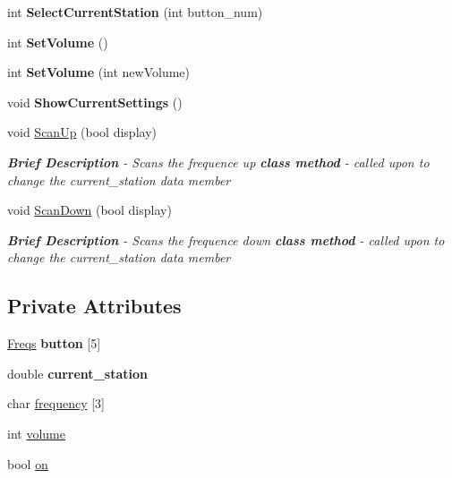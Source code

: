 \begin{DoxyCompactItemize}
\item 
\hypertarget{class_amfm_radio_ad6aaa684e7dd3fe5d29b626f8f40718d}{int {\bfseries Select\-Current\-Station} (int button\-\_\-num)}\label{class_amfm_radio_ad6aaa684e7dd3fe5d29b626f8f40718d}

\item 
\hypertarget{class_amfm_radio_af1b3db50addf8a0ab32eae9f2e2c321b}{int {\bfseries Set\-Volume} ()}\label{class_amfm_radio_af1b3db50addf8a0ab32eae9f2e2c321b}

\item 
\hypertarget{class_amfm_radio_a173aed5a3f29e59b47d113a444207a75}{int {\bfseries Set\-Volume} (int new\-Volume)}\label{class_amfm_radio_a173aed5a3f29e59b47d113a444207a75}

\item 
\hypertarget{class_amfm_radio_a2ecffea4f575d265b849f283110d46fe}{void {\bfseries Show\-Current\-Settings} ()}\label{class_amfm_radio_a2ecffea4f575d265b849f283110d46fe}

\item 
void \hyperlink{class_amfm_radio_a520620b35bb69e35efbccc52a159afbb}{Scan\-Up} (bool display)
\begin{DoxyCompactList}\small\item\em {\bfseries Brief Description} -\/ Scans the frequence up {\bfseries {\itshape class method}} -\/ called upon to change the current\-\_\-station data member \end{DoxyCompactList}\item 
void \hyperlink{class_amfm_radio_a70034b73f832e7f3b73d9cdca0691401}{Scan\-Down} (bool display)
\begin{DoxyCompactList}\small\item\em {\bfseries Brief Description} -\/ Scans the frequence down {\bfseries {\itshape class method}} -\/ called upon to change the current\-\_\-station data member \end{DoxyCompactList}\end{DoxyCompactItemize}
\subsection*{Private Attributes}
\begin{DoxyCompactItemize}
\item 
\hypertarget{class_amfm_radio_a1d41c6597c8f8f57429cb973ddcac5cb}{\hyperlink{struct_freqs}{Freqs} {\bfseries button} \mbox{[}5\mbox{]}}\label{class_amfm_radio_a1d41c6597c8f8f57429cb973ddcac5cb}

\item 
\hypertarget{class_amfm_radio_abf7dcece93ab1ddd45be0b1da20511b4}{double {\bfseries current\-\_\-station}}\label{class_amfm_radio_abf7dcece93ab1ddd45be0b1da20511b4}

\item 
char \hyperlink{class_amfm_radio_af9816519f446eac6b34e511d5d5d1fd8}{frequency} \mbox{[}3\mbox{]}
\item 
int \hyperlink{class_amfm_radio_ad8985cd1b3a2fd7011701d62631395fc}{volume}
\item 
bool \hyperlink{class_amfm_radio_a018c619e4fde3bfb20a9d1c6117dc1f2}{on}
\end{DoxyCompactItemize}


